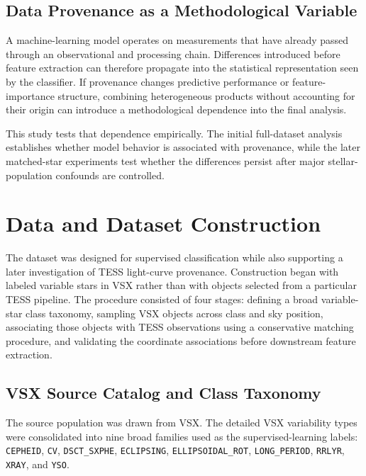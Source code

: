 \documentclass[linenumbers]{aastex701}
\begin{document}

\subsection{Data Provenance as a Methodological Variable}
A machine-learning model operates on measurements that have already passed through an observational and processing chain. Differences introduced before feature extraction can therefore propagate into the statistical representation seen by the classifier. If provenance changes predictive performance or feature-importance structure, combining heterogeneous products without accounting for their origin can introduce a methodological dependence into the final analysis.

This study tests that dependence empirically. The initial full-dataset analysis establishes whether model behavior is associated with provenance, while the later matched-star experiments test whether the differences persist after major stellar-population confounds are controlled.


\section{Data and Dataset Construction}
\label{sec:dataset}

The dataset was designed for supervised classification while also supporting a later investigation of TESS light-curve provenance. Construction began with labeled variable stars in VSX rather than with objects selected from a particular TESS pipeline. The procedure consisted of four stages: defining a broad variable-star class taxonomy, sampling VSX objects across class and sky position, associating those objects with TESS observations using a conservative matching procedure, and validating the coordinate associations before downstream feature extraction.

\subsection{VSX Source Catalog and Class Taxonomy}
\label{subsec:vsx_taxonomy}
The source population was drawn from VSX. The detailed VSX variability types were consolidated into nine broad families used as the supervised-learning labels: \texttt{CEPHEID}, \texttt{CV}, \texttt{DSCT\_SXPHE}, \texttt{ECLIPSING}, \texttt{ELLIPSOIDAL\_ROT}, \texttt{LONG\_PERIOD}, \texttt{RRLYR}, \texttt{XRAY}, and \texttt{YSO}.
\end{document}
